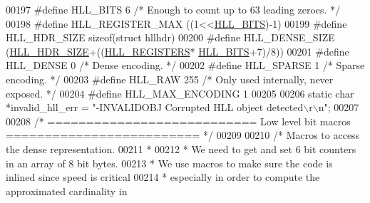 \begin{DoxyCode}
00197 \textcolor{preprocessor}{#}\textcolor{preprocessor}{define} \textcolor{preprocessor}{HLL\_BITS} 6 \textcolor{comment}{/* Enough to count up to 63 leading zeroes. */}
00198 \textcolor{preprocessor}{#}\textcolor{preprocessor}{define} \textcolor{preprocessor}{HLL\_REGISTER\_MAX} \textcolor{preprocessor}{(}\textcolor{preprocessor}{(}1\textcolor{preprocessor}{<<}\hyperlink{hyperloglog_8c_a9023d37e2b4b782b2b922d9599894d14}{HLL\_BITS}\textcolor{preprocessor}{)}\textcolor{preprocessor}{-}1\textcolor{preprocessor}{)}
00199 \textcolor{preprocessor}{#}\textcolor{preprocessor}{define} \textcolor{preprocessor}{HLL\_HDR\_SIZE} \textcolor{keyword}{sizeof}\textcolor{preprocessor}{(}\textcolor{keyword}{struct} \textcolor{preprocessor}{hllhdr}\textcolor{preprocessor}{)}
00200 \textcolor{preprocessor}{#}\textcolor{preprocessor}{define} \textcolor{preprocessor}{HLL\_DENSE\_SIZE} \textcolor{preprocessor}{(}\hyperlink{hyperloglog_8c_af04dc163054c4c79b0e6c93057b4032f}{HLL\_HDR\_SIZE}\textcolor{preprocessor}{+}\textcolor{preprocessor}{(}\textcolor{preprocessor}{(}\hyperlink{hyperloglog_8c_aa053beb90136828dcb46545c7445fc36}{HLL\_REGISTERS}\textcolor{preprocessor}{*}
      \hyperlink{hyperloglog_8c_a9023d37e2b4b782b2b922d9599894d14}{HLL\_BITS}\textcolor{preprocessor}{+}7\textcolor{preprocessor}{)}\textcolor{preprocessor}{/}8\textcolor{preprocessor}{)}\textcolor{preprocessor}{)}
00201 \textcolor{preprocessor}{#}\textcolor{preprocessor}{define} \textcolor{preprocessor}{HLL\_DENSE} 0 \textcolor{comment}{/* Dense encoding. */}
00202 \textcolor{preprocessor}{#}\textcolor{preprocessor}{define} \textcolor{preprocessor}{HLL\_SPARSE} 1 \textcolor{comment}{/* Sparse encoding. */}
00203 \textcolor{preprocessor}{#}\textcolor{preprocessor}{define} \textcolor{preprocessor}{HLL\_RAW} 255 \textcolor{comment}{/* Only used internally, never exposed. */}
00204 \textcolor{preprocessor}{#}\textcolor{preprocessor}{define} \textcolor{preprocessor}{HLL\_MAX\_ENCODING} 1
00205 
00206 \textcolor{keyword}{static} \textcolor{keywordtype}{char} *invalid\_hll\_err = \textcolor{stringliteral}{"-INVALIDOBJ Corrupted HLL object detected\(\backslash\)r\(\backslash\)n"};
00207 
00208 \textcolor{comment}{/* =========================== Low level bit macros ========================= */}
00209 
00210 \textcolor{comment}{/* Macros to access the dense representation.}
00211 \textcolor{comment}{ *}
00212 \textcolor{comment}{ * We need to get and set 6 bit counters in an array of 8 bit bytes.}
00213 \textcolor{comment}{ * We use macros to make sure the code is inlined since speed is critical}
00214 \textcolor{comment}{ * especially in order to compute the approximated cardinality in}

\end{DoxyCode}
